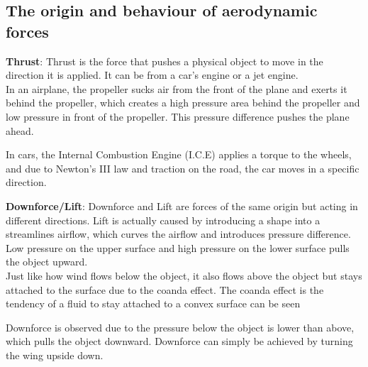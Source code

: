 \documentclass[11pt, a4paper]{article}
\begin{document}
\subsection{The origin and behaviour of aerodynamic forces}
\textbf{Thrust}: Thrust is the force that pushes a physical object to move in the direction it is applied. It can be from a car's engine or a jet engine.\\
In an airplane, the propeller sucks air from the front of the plane and exerts it behind the propeller, which creates a high pressure area behind the propeller and low pressure in front of the propeller.
This pressure difference pushes the plane ahead.

In cars, the Internal Combustion Engine (I.C.E) applies a torque to the wheels, and due to Newton's III law and traction on the road, the car moves in a specific direction. 
\bigbreak{}

\textbf{Downforce/Lift}: Downforce and Lift are forces of the same origin but acting in different directions.
Lift is actually caused by introducing a shape into a streamlines airflow, which curves the airflow and introduces pressure difference. Low pressure on the upper surface
and high pressure on the lower surface pulls the object upward.~\cite{lift}\\
Just like how wind flows below the object, it also flows above the object but stays attached to the surface due to the coanda effect. The coanda effect is the tendency of a fluid to stay attached to a convex surface can be seen

Downforce is observed due to the pressure below the object is lower than above, which pulls the object downward.
Downforce can simply be achieved by turning the wing upside down. \\
\end{document}
